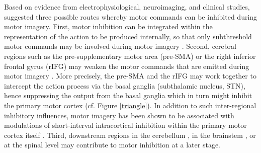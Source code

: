 \documentclass[utf8]{template/frontiersSCNS} %
\begin{document}

Based on evidence from electrophysiological, neuroimaging, and clinical studies, \cite{guillot_imagining_2012} suggested three possible routes whereby motor commands can be inhibited during motor imagery. First, motor inhibition can be integrated within the representation of the action to be produced internally, so that only subthreshold motor commands may be involved during motor imagery \citep[see also][]{bach_why_2021, glover_executive_2020}. Second, cerebral regions such as the pre-supplementary motor area (pre-SMA) \citep{kasess_suppressive_2008} or the right inferior frontal gyrus (rIFG) may weaken the motor commands that are emitted during motor imagery \citep[e.g.,][]{angelini_motor_2015, angelini_proactive_2016}. More precisely, the pre-SMA and the rIFG may work together to intercept the action process via the basal ganglia (subthalamic nucleus, STN), hence suppressing the output from the basal ganglia which in turn might inhibit the primary motor cortex \citep{aron_reactive_2011} (cf. Figure \ref{triangle}). In addition to such inter-regional inhibitory influences, motor imagery has been shown to be associated with modulations of short-interval intracortical inhibition within the primary motor cortex itself \citep{neige_unravelling_2020}.
Third, downstream regions in the cerebellum \citep[e.g.,][]{lotze_activation_1999}, in the brainstem \citep[e.g.,][]{jeannerod_neural_2001, jeannerod_motor_2006}, or at the spinal level may contribute to motor inhibition at a later stage.
\end{document}
